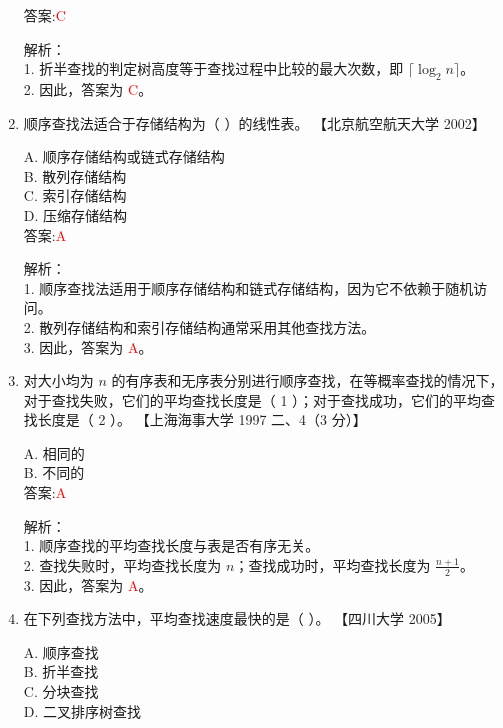 \documentclass[lang=cn,newtx,10pt,scheme=chinese]{../../../elegantbook}
\begin{document}
\begin{enumerate}
    答案:\textcolor{red}{C}

    解析：\\
    1. 折半查找的判定树高度等于查找过程中比较的最大次数，即 $\lceil \log_2 n \rceil$。\\
    2. 因此，答案为 \textcolor{red}{C}。\\

\item 顺序查找法适合于存储结构为（ ）的线性表。  
    【北京航空航天大学 2002】  

    A. 顺序存储结构或链式存储结构 \\  
    B. 散列存储结构 \\  
    C. 索引存储结构 \\  
    D. 压缩存储结构 \\  

    答案:\textcolor{red}{A}

    解析：\\
    1. 顺序查找法适用于顺序存储结构和链式存储结构，因为它不依赖于随机访问。\\
    2. 散列存储结构和索引存储结构通常采用其他查找方法。\\
    3. 因此，答案为 \textcolor{red}{A}。\\

\item 对大小均为 $n$ 的有序表和无序表分别进行顺序查找，在等概率查找的情况下，对于查找失败，它们的平均查找长度是（ 1 ）；对于查找成功，它们的平均查找长度是（ 2 ）。  
    【上海海事大学 1997 二、4（3 分）】  

    A. 相同的 \\  
    B. 不同的 \\  

    答案:\textcolor{red}{A}

    解析：\\
    1. 顺序查找的平均查找长度与表是否有序无关。\\
    2. 查找失败时，平均查找长度为 $n$；查找成功时，平均查找长度为 $\frac{n+1}{2}$。\\
    3. 因此，答案为 \textcolor{red}{A}。\\

\item 在下列查找方法中，平均查找速度最快的是（ ）。  
    【四川大学 2005】  

    A. 顺序查找 \\  
    B. 折半查找 \\  
    C. 分块查找 \\  
    D. 二叉排序树查找 \\  


\end{enumerate}
\end{document}
